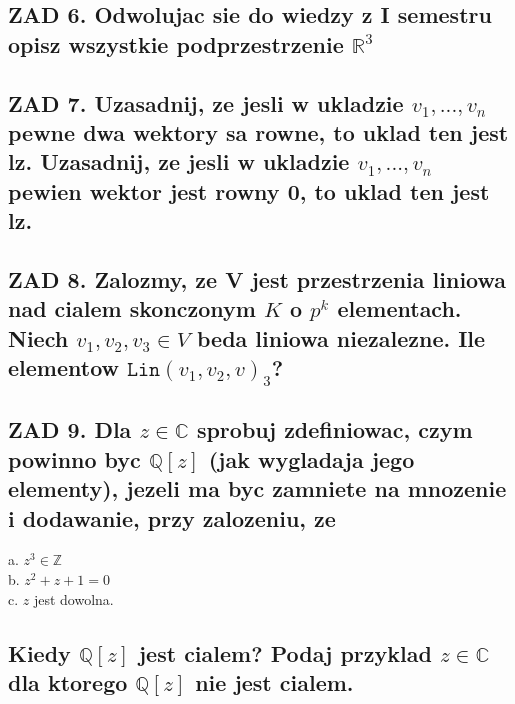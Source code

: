 \documentclass{article}
\newcommand{\R}{\mathbb{R}}
\newcommand{\Q}{\mathbb{Q}}
\newcommand{\Z}{\mathbb{Z}}
\newcommand{\C}{\mathbb{C}}
\begin{document}
\subsection*{ZAD 6. \color{txt}Odwolujac sie do wiedzy z I semestru opisz wszystkie podprzestrzenie $\R^3$}
\subsection*{ZAD 7. \color{txt}Uzasadnij, ze jesli w ukladzie $v_1, ..., v_n$ pewne dwa wektory sa rowne, to uklad ten jest lz. Uzasadnij, ze jesli w ukladzie $v_1, ..., v_n$ pewien wektor jest rowny 0, to uklad ten jest lz.}
\subsection*{ZAD 8. \color{txt}Zalozmy, ze V jest przestrzenia liniowa nad cialem skonczonym $K$ o $p^k$ elementach. Niech $v_1,v_2,v_3\in V$ beda liniowa niezalezne. Ile elementow $\texttt{Lin}(v_1,v_2,v)_3$?}
\subsection*{ZAD 9. \color{txt}Dla $z\in \C$ sprobuj zdefiniowac, czym powinno byc $\Q[z]$ (jak wygladaja jego elementy), jezeli ma byc zamniete na mnozenie i dodawanie, przy zalozeniu, ze}
a. $z^3\in\Z$\\
b. $z^2+z+1=0$\\
c. $z$ jest dowolna.
\subsection*{\color{txt}Kiedy $\Q[z]$ jest cialem? Podaj przyklad $z\in\C$ dla ktorego $\Q[z]$ nie jest cialem.}
\end{document}

